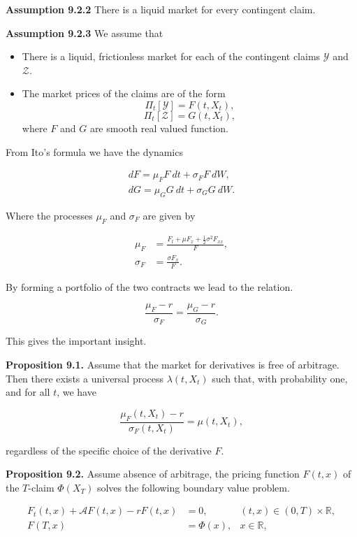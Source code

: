 \documentclass[
]{article}
\providecommand{\tightlist}{%
  \setlength{\itemsep}{0pt}\setlength{\parskip}{0pt}}
\begin{document}
\textbf{Assumption 9.2.2} There is a liquid market for every contingent
claim.

\textbf{Assumption 9.2.3} We assume that

\begin{itemize}
\tightlist
\item
  There is a liquid, frictionless market for each of the contingent
  claims \(\mathcal{Y}\) and \(\mathcal{Z}\).
\item
  The market prices of the claims are of the form
  \[ \Pi_t[\mathcal{Y}] = F(t,X_t),\]
  \[ \Pi_t[\mathcal{Z}] = G(t,X_t),\] where \(F\) and \(G\) are smooth
  real valued function.
\end{itemize}

From Ito's formula we have the dynamics

\begin{align*}
dF=\mu_F F\ dt+\sigma_F F\ dW,\\
dG=\mu_G G\ dt+\sigma_G G\ dW.
\end{align*}

Where the processes \(\mu_F\) and \(\sigma_F\) are given by

\begin{align*}
\mu_F&=\frac{F_t+\mu F_x+\frac{1}{2}\sigma^2 F_{xx}}{F},\\
\sigma_F&=\frac{\sigma F_x}{F}.
\end{align*}

By forming a portfolio of the two contracts we lead to the relation.

\[
\frac{\mu_F-r}{\sigma_F}=\frac{\mu_G-r}{\sigma_G}.
\]

This gives the important insight.

\textbf{Proposition 9.1.} Assume that the market for derivatives is free
of arbitrage. Then there exists a universal process \(\lambda(t,X_t)\)
such that, with probability one, and for all \(t\), we have

\[
\frac{\mu_F(t,X_t)-r}{\sigma_F(t,X_t)}=\mu(t,X_t),
\]

regardless of the specific choice of the derivative \(F\).

\textbf{Proposition 9.2.} Assume absence of arbitrage, the pricing
function \(F(t,x)\) of the \(T\)-claim \(\Phi(X_T)\) solves the
following boundary value problem.

\begin{align*}
F_t(t,x)+\mathcal{A}F(t,x)-rF(t,x)&=0,\hspace{15pt}&(t,x)\in (0,T)\times \mathbb{R},\\
F(T,x)&=\Phi(x), &x\in\mathbb{R},
\end{align*}
\end{document}
